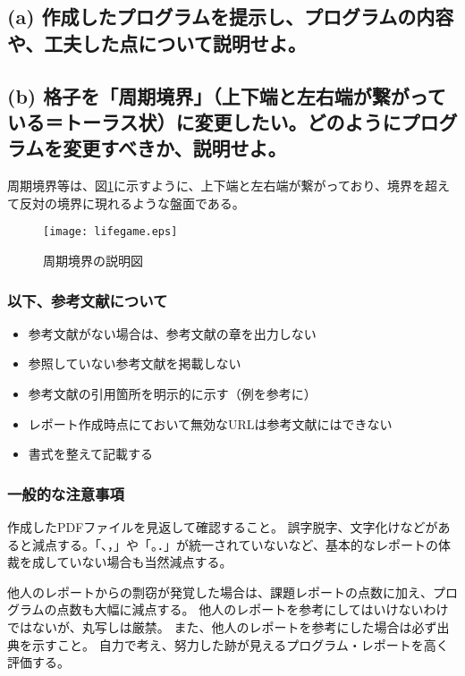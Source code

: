 \documentclass[a4j,11pt]{jarticle}
\begin{document}
\subsection*{(a) 作成したプログラムを提示し、プログラムの内容や、工夫した点について説明せよ。}
\subsection*{(b) 格子を「周期境界」（上下端と左右端が繋がっている＝トーラス状）に変更したい。どのようにプログラムを変更すべきか、説明せよ。}
周期境界等は、図\ref{life}に示すように、上下端と左右端が繋がっており、境界を超えて反対の境界に現れるような盤面である。


\begin{figure}[htbp]
  \centering
  \texttt{[image: lifegame.eps]}
  \caption{周期境界の説明図}
  \label{life}
\end{figure}


\subsubsection*{以下、参考文献について}
\begin{itemize}
\item 参考文献がない場合は、参考文献の章を出力しない
\item 参照していない参考文献を掲載しない
\item 参考文献の引用箇所を明示的に示す（例を参考に）
\item レポート作成時点にておいて無効なURLは参考文献にはできない
\item 書式を整えて記載する
\end{itemize}

\subsubsection*{一般的な注意事項}
作成したPDFファイルを見返して確認すること。
誤字脱字、文字化けなどがあると減点する。「、，」や「。．」が統一されていないなど、基本的なレポートの体裁を成していない場合も当然減点する。

他人のレポートからの剽窃が発覚した場合は、課題レポートの点数に加え、プログラムの点数も大幅に減点する。
他人のレポートを参考にしてはいけないわけではないが、丸写しは厳禁。
また、他人のレポートを参考にした場合は必ず出典を示すこと\cite{friend1}。
自力で考え、努力した跡が見えるプログラム・レポートを高く評価する。
\end{document}
